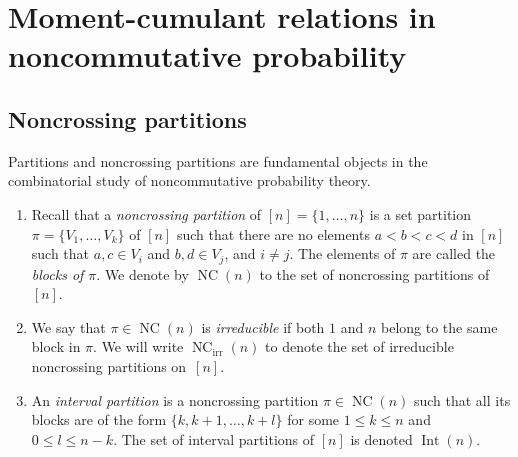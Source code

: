\documentclass[pdftex]{sigma}%
\numberwithin{equation}{section}
\newcommand{\NC}{\operatorname{NC}}
\newcommand{\Int}{\operatorname{Int}}
\begin{document}
\section{Moment-cumulant relations in noncommutative probability}\label{sec:momentcumulantrel}

\subsection{Noncrossing partitions}

Partitions and noncrossing partitions are fundamental objects in the combinatorial study of noncommutative probability theory.
\begin{Definition}\quad
\begin{enumerate}\itemsep=0pt
\item Recall that a \textit{noncrossing partition} of $[n] = \{1,\dots,n\}$ is a set partition $\pi = \{V_1,\dots,V_k\}$ of $[n]$ such that there are no elements $a<b<c<d$ in $[n]$ such that $a,c \in V_i$ and $b,d \in V_j$, and $i\neq j$. The elements of $\pi$ are called the \textit{blocks of $\pi$}. We denote by $\NC(n)$ to the set of noncrossing partitions of $[n]$.
\item We say that $\pi \in \NC(n)$ is \textit{irreducible} if both $1$ and $n$ belong to the same block in $\pi$. We will write $\NC_{\mathrm{irr}}(n)$ to denote the set of irreducible noncrossing partitions on~$[n]$.
\item An \textit{interval partition} is a noncrossing partition $\pi\in\NC(n)$ such that all its blocks are of the form $\{k,k+1,\dots,k+l\}$ for some $1\leq k\leq n$ and $0\leq l\leq n-k$. The set of interval partitions of $[n]$ is denoted $\Int(n)$.
\end{enumerate}
\end{Definition}
\end{document}
